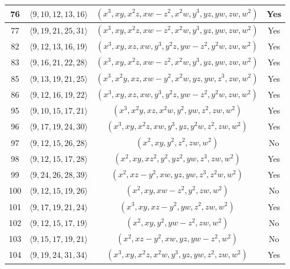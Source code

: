 \documentclass{amsart}
\theoremstyle{plain}
\theoremstyle{definition}
\numberwithin{theorem}{section}
\numberwithin{equation}{section}
\numberwithin{equation}{theorem}
\begin{document}
\begin{longtable}{|c|c|c|c|}
\hline
76 & $\langle 9,10,12,13,16\rangle$ & $(x^3,xy,x^2z,xw-z^2,x^2w,y^3,yz,yw,zw,w^2)$ & Yes\\

\hline
77 & $\langle 9,19,21,25,31\rangle$ & $(x^3,xy,x^2z,xw-z^2,x^2w,y^3,yz,yw,zw,w^2)$ & Yes\\

\hline
82 & $\langle 9,12,13,16,19\rangle$ & $(x^3,xy,xz,xw,y^3,y^2z,yw-z^2,y^2w,zw,w^2)$ & Yes\\

\hline
83 & $\langle 9,16,21,22,28\rangle$ & $(x^3,xy,x^2z,xw-z^2,x^2w,y^3,yz,yw,zw,w^2)$ & Yes\\

\hline
85 & $\langle 9,13,19,21,25\rangle$ & $(x^3,x^2y,xz,xw-y^2,x^2w,yz,yw,z^3,zw,w^2)$ & Yes\\

\hline
86 & $\langle 9,12,16,19,22\rangle$ & $(x^3,xy,xz,xw,y^3,y^2z,yw-z^2,y^2w,zw,w^2)$ & Yes\\

\hline
95 &  $\langle 9,10,15,17,21\rangle$ & $(x^3,x^2y,xz,x^2w,y^2,yw,z^2,zw,w^2)$ & Yes\\

\hline
96 &  $\langle 9,17,19,24,30\rangle$ & $(x^3,xy,x^2z,xw,y^3,yz,y^2w,z^2,zw,w^2)$ & Yes\\

\hline
97 &  $\langle 9,12,15,26,28\rangle$ & $(x^2,xy,y^2,z^2,zw,w^2)$ & No\\

\hline
98 &  $\langle 9,12,15,17,28\rangle$ & $(x^2,xy,xz^2,y^2,yz^2,yw,z^3,zw,w^2)$ & Yes\\

\hline
99 &  $\langle 9,24,26,28,39\rangle$ & $(x^2,xz-y^2,xw,yz,yw,z^3,z^2w,w^2)$ & Yes\\

\hline
100 &  $\langle 9,12,15,19,26\rangle$ & $(x^2,xy,xw-z^2,y^2,zw,w^2)$ & No\\

\hline
101 &  $\langle 9,17,19,21,24\rangle$ & $(x^3,xy,xz-y^2,yw,z^2,zw,w^2)$ & Yes\\

\hline
102 &  $\langle 9,12,15,17,19\rangle$ & $(x^2,xy,y^2,yw-z^2,zw,w^2)$ & No\\

\hline
103 &  $\langle 9,15,17,19,21\rangle$ & $(x^2,xz-y^2,xw,yz,yw-z^2,w^2)$ & No\\

\hline
104 &  $\langle 9,19,24,31,34\rangle$ & $(x^3,xy,x^2z,x^2w,y^3,yz,yw,z^2,zw,w^2)$ & Yes\\


\end{longtable}
\end{document}

